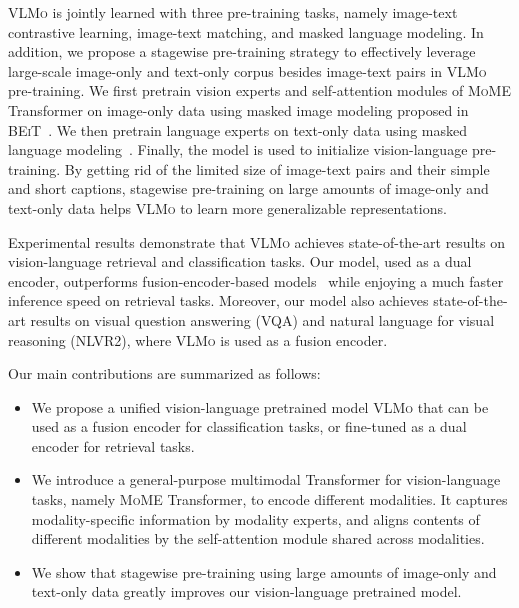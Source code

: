 \documentclass{article}
\newcommand\our{\textsc{VLMo}}
\newcommand\mome{\textsc{MoME}}
\newcommand\beit{\textsc{BEiT}}
\begin{document}
\our{} is jointly learned with three pre-training tasks, namely image-text contrastive learning, image-text matching, and masked language modeling.
In addition, we propose a stagewise pre-training strategy to effectively leverage large-scale image-only and text-only corpus besides image-text pairs in \our{} pre-training.
We first pretrain vision experts and self-attention modules of \mome{} Transformer on image-only data using masked image modeling proposed in \beit{}~\citep{beit}. 
We then pretrain language experts on text-only data using masked language modeling~\citep{bert}.
Finally, the model is used to initialize vision-language pre-training.
By getting rid of the limited size of image-text pairs and their simple and short captions, stagewise pre-training on large amounts of image-only and text-only data helps \our{} to learn more generalizable representations.

Experimental results demonstrate that \our{} achieves state-of-the-art results on vision-language retrieval and classification tasks.
Our model, used as a dual encoder, outperforms fusion-encoder-based models~\citep{uniter,villa,vilt,albef} while enjoying a much faster inference speed on retrieval tasks.
Moreover, our model also achieves state-of-the-art results on visual question answering (VQA) and natural language for visual reasoning (NLVR2), where \our{} is used as a fusion encoder.

Our main contributions are summarized as follows:
\begin{itemize}[leftmargin=1.5em]
\item We propose a unified vision-language pretrained model \our{} that can be used as a fusion encoder for classification tasks, or fine-tuned as a dual encoder for retrieval tasks.
\item We introduce a general-purpose multimodal Transformer for vision-language tasks, namely \mome{} Transformer, to encode different modalities. It captures modality-specific information by modality experts, and aligns contents of different modalities by the self-attention module shared across modalities.
\item We show that stagewise pre-training using large amounts of image-only and text-only data greatly improves our vision-language pretrained model.
\end{itemize}
\end{document}
